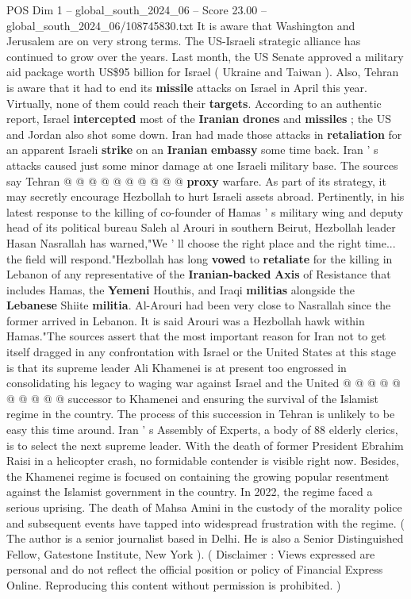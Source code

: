 \begin{textsample}{POS Dim 1 – global\_south\_2024\_06 – Score 23.00 – global\_south\_2024\_06/108745830.txt}
It is aware that Washington and Jerusalem are on very strong terms.
The US-Israeli strategic alliance has continued to grow over the years.
Last month, the US Senate approved a military aid package worth US\$95 billion for Israel ( Ukraine and Taiwan ).
Also, Tehran is aware that it had to end its \textbf{missile} attacks on Israel in April this year.
Virtually, none of them could reach their \textbf{targets}.
According to an authentic report, Israel \textbf{intercepted} most of the \textbf{Iranian} \textbf{drones} and \textbf{missiles} ; the US and Jordan also shot some down.
Iran had made those attacks in \textbf{retaliation} for an apparent Israeli \textbf{strike} on an \textbf{Iranian} \textbf{embassy} some time back.
Iran ' s attacks caused just some minor damage at one Israeli military base.
The sources say Tehran @ @ @ @ @ @ @ @ @ @ \textbf{proxy} warfare.
As part of its strategy, it may secretly encourage Hezbollah to hurt Israeli assets abroad.
Pertinently, in his latest response to the killing of co-founder of Hamas ' s military wing and deputy head of its political bureau Saleh al Arouri in southern Beirut, Hezbollah leader Hasan Nasrallah has warned,"We ' ll choose the right place and the right time... the field will respond."Hezbollah has long \textbf{vowed} to \textbf{retaliate} for the killing in Lebanon of any representative of the \textbf{Iranian-backed} \textbf{Axis} of Resistance that includes Hamas, the \textbf{Yemeni} Houthis, and Iraqi \textbf{militias} alongside the \textbf{Lebanese} Shiite \textbf{militia}.
Al-Arouri had been very close to Nasrallah since the former arrived in Lebanon.
It is said Arouri was a Hezbollah hawk within Hamas."The sources assert that the most important reason for Iran not to get itself dragged in any confrontation with Israel or the United States at this stage is that its supreme leader Ali Khamenei is at present too engrossed in consolidating his legacy to waging war against Israel and the United @ @ @ @ @ @ @ @ @ @ successor to Khamenei and ensuring the survival of the Islamist regime in the country.
The process of this succession in Tehran is unlikely to be easy this time around.
Iran ' s Assembly of Experts, a body of 88 elderly clerics, is to select the next supreme leader.
With the death of former President Ebrahim Raisi in a helicopter crash, no formidable contender is visible right now.
Besides, the Khamenei regime is focused on containing the growing popular resentment against the Islamist government in the country.
In 2022, the regime faced a serious uprising.
The death of Mahsa Amini in the custody of the morality police and subsequent events have tapped into widespread frustration with the regime. ( The author is a senior journalist based in Delhi.
He is also a Senior Distinguished Fellow, Gatestone Institute, New York ). ( Disclaimer : Views expressed are personal and do not reflect the official position or policy of Financial Express Online.
Reproducing this content without permission is prohibited. )


\end{textsample}
